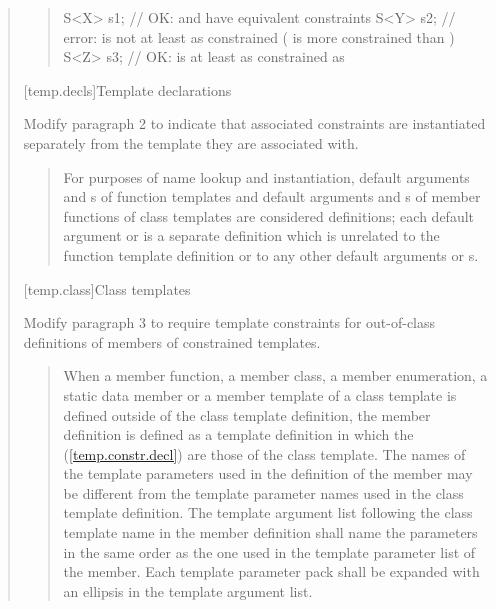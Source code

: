 \begin{quote}
\begin{quote}
\begin{addedblock}
\begin{codeblock}
S<X> s1; // OK:  and  have equivalent constraints
S<Y> s2; // error:  is not at least as constrained  ( is more constrained than )
S<Z> s3; // OK:  is at least as constrained as 
\end{codeblock}
\exitexample
\end{addedblock}
\end{quote}


\setcounter{section}{5}
[temp.decls]{Template declarations}

Modify paragraph 2 to indicate that associated constraints are
instantiated separately from the template they are associated with.

\begin{quote}
\setcounter{Paras}{1}
For purposes of name lookup and instantiation, default 
arguments and
s of function templates and default
arguments and 
s of member functions of class
templates are considered definitions; each default 
argument or 
 is a separate definition which is 
unrelated to the function template definition or to any other default 
arguments or 
s.
\end{quote}


[temp.class]{Class templates}

Modify paragraph 3 to require template constraints for out-of-class
definitions of members of constrained templates. 

\begin{quote}
\setcounter{Paras}{2}
\pnum
When a member function, a member class, a member enumeration, a static 
data member or a member template of a class template is defined outside 
of the class template definition, the member definition is defined as a 
template definition in which the 
 (\ref{temp.constr.decl}) are those of 
the class template.
% 
The names of the template parameters used in the definition of the 
member may be different from the template parameter names used in the 
class template definition. The template argument list following the class
template name in the member definition shall name the parameters in the 
same order as the one used in the template parameter list of the member. 
% 
Each template parameter pack shall be expanded with an ellipsis in the 
template argument list.
\end{quote}


\end{quote}
